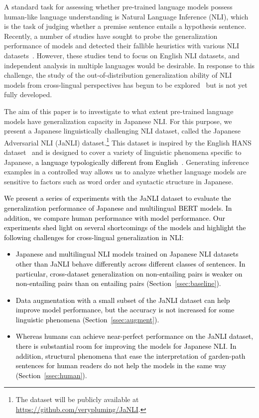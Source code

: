 \documentclass[11pt]{article}
\newcommand{\todo}[1]{\textcolor{black}{#1}}
\begin{document}
A standard task for assessing whether pre-trained language models possess human-like language understanding is Natural Language Inference (NLI),
which is the task of judging whether a premise sentence entails a hypothesis sentence. Recently, a number
of studies have sought to probe the generalization performance of models and detected their fallible heuristics with various NLI datasets~\cite{naik-etal-2018-stress,glockner-etal-2018-breaking,mccoy-etal-2019-right,rozen-etal-2019-diversify,goodwin-etal-2020-probing,
yanaka-etal-2021-exploring}.
However, these studies tend to focus on English NLI datasets, and independent analysis in multiple languages would be desirable.
In response to this challenge, the study of
the out-of-distribution generalization ability of NLI models from cross-lingual perspectives has begun to be explored~\cite{hu-etal-2021-investigating} 
but is not yet fully developed.

The aim of this paper is to investigate to what extent pre-trained language models
have generalization capacity in Japanese NLI.
For this purpose, we present a Japanese linguistically challenging NLI dataset, called the Japanese Adversarial NLI (JaNLI) dataset.\footnote{The dataset will be publicly available at \url{https://github.com/verypluming/JaNLI}.}
This dataset is inspired by the English HANS dataset~\cite{mccoy-etal-2019-right}
and is designed to cover a variety of linguistic phenomena specific to Japanese,
\todo{a language typologically different from English~\cite{hinds1986,shibatani1990languages}}.
Generating inference examples in a controlled way
allows us to analyze whether language models are sensitive to
factors such as word order and syntactic structure in Japanese.

\todo{We present a series of experiments with the JaNLI dataset to evaluate the generalization performance of Japanese and multilingual BERT models.
In addition, we compare human performance with model performance.
Our experiments shed light on several shortcomings of the models
and highlight the following challenges for cross-lingual generalization in NLI:
\begin{itemize}
    \item Japanese and multilingual NLI models trained on Japanese NLI datasets other than JaNLI behave differently across different classes of sentences. In particular, cross-dataset generalization on non-entailing pairs is weaker on non-entailing pairs than on entailing pairs (Section~\ref{ssec:baseline}).
    \item Data augmentation with a small subset of the JaNLI dataset can help improve model performance, but the accuracy is not increased for some linguistic phenomena (Section~\ref{ssec:augment}).
    \item Whereas humans can achieve near-perfect performance on the JaNLI dataset, there is substantial room for improving the models for Japanese NLI. In addition, structural phenomena that ease the interpretation of garden-path sentences for human readers do not help the models in the same way (Section~\ref{ssec:human}).
\end{itemize}
}
\end{document}

